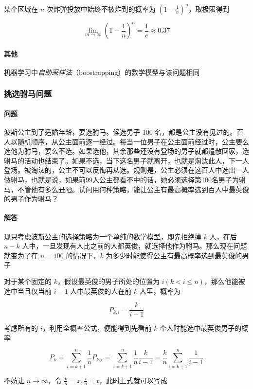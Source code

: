 \documentclass[a4paper, 11pt]{article} %
\begin{document}
某个区域在 $n$ 次炸弹投放中始终不被炸到的概率为 $(1-\frac{1}{n})^n$，取极限得到

$$
\lim\limits_{m\to\infty} (1-\frac{1}{n})^n=\frac{1}{e}\approx 0.37
$$

\paragraph{其他}

机器学习中\emph{自助采样法}（boostrapping）的数学模型与该问题相同

\subsubsection{挑选驸马问题}

\paragraph{问题}

波斯公主到了适婚年龄，要选驸马。候选男子 $100$ 名，都是公主没有见过的。百人以随机顺序，从公主面前逐一经过。每当一位男子在公主面前经过时，公主要么选他为驸马，要么不选。如果选他，其余那些还没有登场的男子就都遣散回家，选驸马的活动也结束了。如果不选，当下这名男子就离开，也就是淘汰此人，下一人登场。被淘汰的，公主不可以反悔再从选。规则是，公主必须在这百人中选出一人做驸马，也就是说，如果前99人公主都看不中的话，她必须选择第100名男子为驸马，不管他有多么丑陋。试问用何种策略，能让公主有最高概率选到百人中最英俊的男子作为驸马？

\paragraph{解答}

现只考虑波斯公主的选择策略为一个单纯的数学模型，即先拒绝掉 $k$ 人，在后 $n-k$ 人中，一旦发现有人比之前的人都英俊，就选择他作为驸马。那么现在问题就变为了在 $n=100$ 的情况下，$k$ 为多少时能使得公主有最高概率选到最英俊的男子

对于某个固定的 $k$，假设最英俊的男子所处的位置为 $i(k<i\le n)$，那么他能被选中当且仅当前 $i-1$ 人中最英俊的人在前 $k$ 人里，概率为 

$$
P_{k,i}=\frac{k}{i-1}
$$

考虑所有的 $i$，利用全概率公式，便能得到先看前 $k$ 个人时能选中最英俊男子的概率

$$
P_k=\sum\limits_{i=k+1}^{n}\frac{1}{n}P_{k,i}=\sum\limits_{i=k+1}^n\frac{1}{n}\frac{k}{i-1}=\frac{k}{n}\sum\limits_{i=k+1}^n\frac{1}{i-1}
$$

不妨让 $n\to\infty$，令 $\frac{k}{n}=x,\frac{i}{n}=t$，此时上式就可以写成
\end{document}

